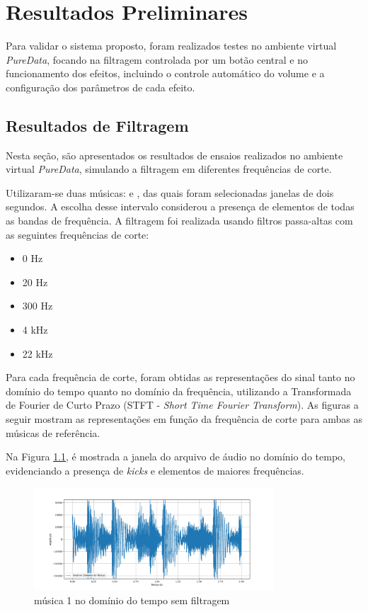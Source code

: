 \chapter[Resultados Preliminares]{Resultados Preliminares}
\label{sec:Resultados}

Para validar o sistema proposto, foram realizados testes no ambiente virtual \textit{PureData}, focando na filtragem controlada por um botão central e no funcionamento dos efeitos, incluindo o controle automático do volume e a configuração dos parâmetros de cada efeito.

\section{Resultados de Filtragem}

Nesta seção, são apresentados os resultados de ensaios realizados no ambiente virtual \textit{PureData}, simulando a filtragem em diferentes frequências de corte.

Utilizaram-se duas músicas: \cite{track01} e \cite{track02}, das quais foram selecionadas janelas de dois segundos. A escolha desse intervalo considerou a presença de elementos de todas as bandas de frequência. A filtragem foi realizada usando filtros passa-altas com as seguintes frequências de corte:

\begin{itemize}
    \item 0 Hz
    \item 20 Hz
    \item 300 Hz
    \item 4 kHz
    \item 22 kHz
\end{itemize}

Para cada frequência de corte, foram obtidas as representações do sinal tanto no domínio do tempo quanto no domínio da frequência, utilizando a Transformada de Fourier de Curto Prazo (STFT - \textit{Short Time Fourier Transform}). As figuras a seguir mostram as representações em função da frequência de corte para ambas as músicas de referência.

Na Figura \ref{fig40}, é mostrada a janela do arquivo de áudio no domínio do tempo, evidenciando a presença de \textit{kicks} e elementos de maiores frequências.

\begin{figure}[h]
    \centering
    \includegraphics[width=0.8\textwidth]{figuras/fig40.png}
    \caption{música 1 no domínio do tempo sem filtragem}
    \label{fig40}
\end{figure}

